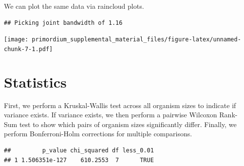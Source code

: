 \documentclass[]{book}
\newenvironment{Shaded}{\begin{snugshade}}{\end{snugshade}}
\newcommand{\DataTypeTok}[1]{\textcolor[rgb]{0.13,0.29,0.53}{#1}}
\newcommand{\DecValTok}[1]{\textcolor[rgb]{0.00,0.00,0.81}{#1}}
\newcommand{\FloatTok}[1]{\textcolor[rgb]{0.00,0.00,0.81}{#1}}
\newcommand{\KeywordTok}[1]{\textcolor[rgb]{0.13,0.29,0.53}{\textbf{#1}}}
\newcommand{\NormalTok}[1]{#1}
\newcommand{\OperatorTok}[1]{\textcolor[rgb]{0.81,0.36,0.00}{\textbf{#1}}}
\newcommand{\StringTok}[1]{\textcolor[rgb]{0.31,0.60,0.02}{#1}}
\begin{document}
We can plot the same data via raincloud plots.

\begin{verbatim}
## Picking joint bandwidth of 1.16
\end{verbatim}

\texttt{[image: primordium\_supplemental\_material\_files/figure-latex/unnamed-chunk-7-1.pdf]}

\hypertarget{statistics}{%
\section{Statistics}\label{statistics}}

First, we perform a Kruskal-Wallis test across all organism sizes to indicate if variance exists.
If variance exists, we then perform a pairwise Wilcoxon Rank-Sum test to show which pairs of organism sizes significantly differ.
Finally, we perform Bonferroni-Holm corrections for multiple comparisons.

\begin{Shaded}
\end{Shaded}

\begin{verbatim}
##         p_value chi_squared df less_0.01
## 1 1.506351e-127    610.2553  7      TRUE
\end{verbatim}
\end{document}
